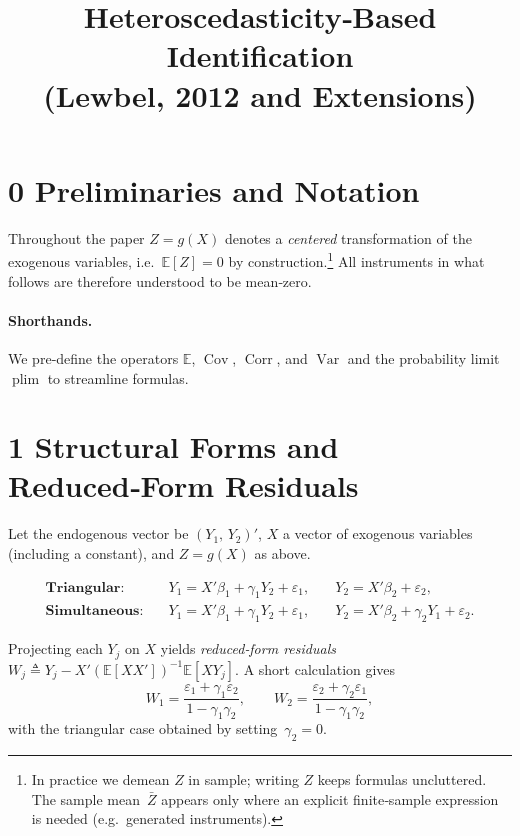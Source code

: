 \documentclass{article}
\newcommand{\E}{\mathbb{E}}
\newcommand{\cov}{\operatorname{Cov}}
\newcommand{\corr}{\operatorname{Corr}}
\newcommand{\var}{\operatorname{Var}}
\newcommand{\plim}{\operatorname*{plim}}
\theoremstyle{plain}
\begin{document}
\title{Heteroscedasticity‐Based Identification \\ (Lewbel, 2012 and Extensions)}
\maketitle

\section*{0 \quad Preliminaries and Notation}

Throughout the paper \(Z=g(X)\) denotes a \emph{centered} transformation of the
exogenous variables, i.e.\ \(\E[Z]=0\) by construction.\footnote{In practice we
demean $Z$ in sample; writing \(Z\) keeps formulas uncluttered.
The sample mean~$\bar Z$ appears only where an explicit finite‑sample
expression is needed (e.g.\ generated instruments).}
All instruments in what follows are therefore understood to be mean‑zero.

\vspace{-0.5em}
\paragraph{Shorthands.}
We pre‑define the operators \(\E\), \(\cov\), \(\corr\), and \(\var\)
and the probability limit \(\plim\) to streamline formulas.

\section*{1 \quad Structural Forms and Reduced‑Form Residuals}

Let the endogenous vector be \((Y_1,\,Y_2)'\), $X$ a vector of exogenous
variables (including a constant), and $Z=g(X)$ as above.

\begin{align*}
\textbf{Triangular:}\quad
& Y_1 = X'\beta_1 + \gamma_1 Y_2 + \varepsilon_1,
&\quad
  Y_2 = X'\beta_2 + \varepsilon_2, \\[3pt]
\textbf{Simultaneous:}\quad
& Y_1 = X'\beta_1 + \gamma_1 Y_2 + \varepsilon_1,
&\quad
  Y_2 = X'\beta_2 + \gamma_2 Y_1 + \varepsilon_2.
\end{align*}

Projecting each \(Y_j\) on \(X\) yields \emph{reduced‑form residuals}
\(W_j\triangleq Y_j - X'(\E[XX'])^{-1}\E[XY_j]\).
A short calculation gives
\[
W_1 = \frac{\varepsilon_1+\gamma_1\varepsilon_2}{1-\gamma_1\gamma_2},\qquad
W_2 = \frac{\varepsilon_2+\gamma_2\varepsilon_1}{1-\gamma_1\gamma_2},
\]
with the triangular case obtained by setting~\(\gamma_2=0\).
\end{document}
